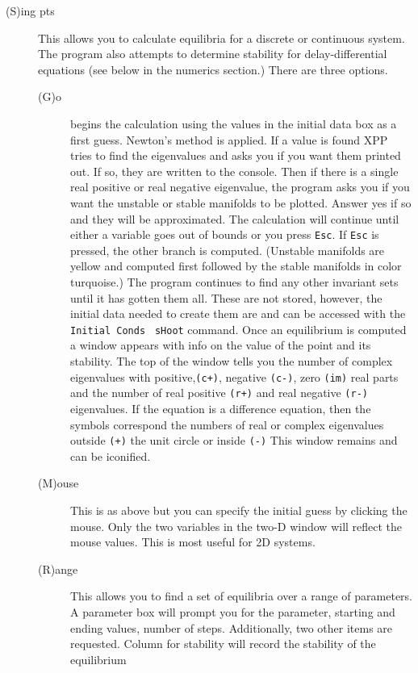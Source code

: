 \documentclass{article}
\newcommand{\tc}[1]{\addcontentsline{toc}{subsection}{#1}}
\begin{document}
\begin{description}
\begin{description}
\end{description}


\tc{Equilibria}\item[(S)ing pts]  This allows you to calculate
equilibria for a discrete or continuous system.  The program also
attempts to determine stability for delay-differential equations (see
below in the numerics section.) There
 are three options.
\begin{description} 
	\item[(G)o] begins the calculation   using the values in the initial 
data box as a first guess.  Newton's method is applied.  If a value is found XPP
 tries to find the eigenvalues and asks you if you want them printed out.  If so,
 they are written to the console.  Then if there is a single real positive or
 real negative eigenvalue, the program asks you if you want the unstable or
 stable manifolds to be plotted.  Answer yes if so and they will be
 approximated. The calculation will continue until either a variable
goes out
 of bounds or you press {\tt Esc}.  If {\tt Esc} is pressed, the other
branch is
 computed. (Unstable manifolds are yellow and computed first followed
by the stable manifolds in color turquoise.) 
 The program continues to find any other invariant sets until it has gotten 
them all.  These are not stored, however, the initial data needed to
create them are and can be accessed with the {\tt Initial Conds} {\tt
sHoot} command. 
Once an 
equilibrium is computed a window 
appears with info on the value of the point and its stability.  The top of 
the window tells you the number of complex eigenvalues with positive,{\tt (c+)}, 
negative {\tt (c-)}, zero {\tt (im)}  real parts and the number of
real positive
{\tt  (r+)}  and 
real negative { \tt (r-)}  eigenvalues. If the equation is a difference equation, 
then the symbols correspond the numbers of real or complex eigenvalues 
outside {\tt (+)}  the unit circle or inside { \tt (-)}
This window remains and can be iconified. 
\item[(M)ouse]  This is as above but you can specify the initial guess by 
clicking the mouse.  Only the two variables in the two-D window will reflect 
the mouse values.  This is most useful for 2D systems.
\item[(R)ange]  This allows you to find a set of equilibria over a range
 of parameters.  A parameter box will prompt you for the parameter, starting
 and ending values, number of steps.  Additionally, two other items are 
requested.  Column for stability will record the stability of the equilibrium 

\end{description}
\end{description}
\end{document}
